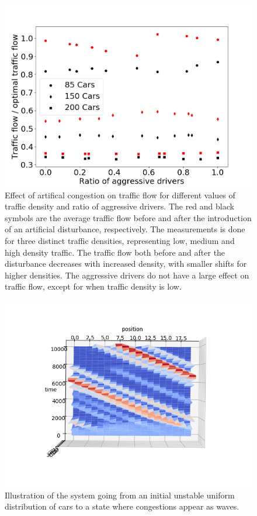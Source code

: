 \documentclass[11pt,a4paper,twocolumn]{article}
\begin{document}
\begin{figure}[ht]     
      \centering
       \includegraphics[scale=0.33]{figs/traffic_density_effect}
       \caption{Effect of artifical congestion on traffic flow for different values of traffic density and ratio of aggressive drivers. The red and black symbols are the average traffic flow before and after the introduction of an artificial disturbance, respectively. The measurements is done for three distinct traffic densities, representing low, medium and high density traffic. The traffic flow both before and after the disturbance decreases with increased density, with smaller shifts for higher densities. The aggressive drivers do not have a large effect on traffic flow, except for when traffic density is low.}
       \label{fig:traffic_density}
 \end{figure}
 
\begin{figure}[t]     
      \centering
       \includegraphics[scale=1, trim={1cm 2.5cm 1cm 3cm}]{figs/phase_transition1.png}
       \caption{Illustration of the system going from an initial unstable uniform distribution of cars to a state where congestions appear as waves.}
       \label{fig:phase_transition}
 \end{figure}
\end{document}
